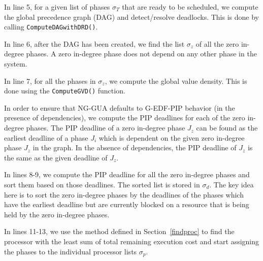 \documentclass[12pt,dvips]{report}
\begin{document}
In line 5, for a given list of phases $\sigma_T$ that are ready to be scheduled, we compute the global precedence graph (DAG) and detect/resolve deadlocks. This is done by calling \texttt{ComputeDAGwithDRD()}. 

In line 6, after the DAG has been created, we find the list $\sigma_{z}$ of all the zero in-degree phases. A zero in-degree phase does not depend on any other phase in the system.

In line 7, for all the phases in $\sigma_{z}$, we compute the global value density. This is done using the \texttt{ComputeGVD()} function.

In order to ensure that NG-GUA defaults to G-EDF-PIP behavior (in the presence of dependencies), we compute the PIP deadlines for each of the zero in-degree phases. The PIP deadline of a zero in-degree phase $J_z$ can be found as the earliest deadline of a phase $J_i$ which is dependent on the given zero in-degree phase $J_z$ in the graph. In the absence of dependencies, the PIP deadline of $J_z$ is the same as the given deadline of $J_z$.

In lines 8-9, we compute the PIP deadline for all the zero in-degree phases and sort them based on those deadlines. The sorted list is stored in $\sigma_d$. The key idea here is to sort the zero in-degree phases by the deadlines of the phases which have the earliest deadline but are currently blocked on a resource that is being held by the zero in-degree phases.

In lines 11-13, we use the method defined in Section~\ref{findproc} to find the processor with the least sum of total remaining execution cost and start assigning the phases to the individual processor lists $\sigma_p$.
\end{document}
